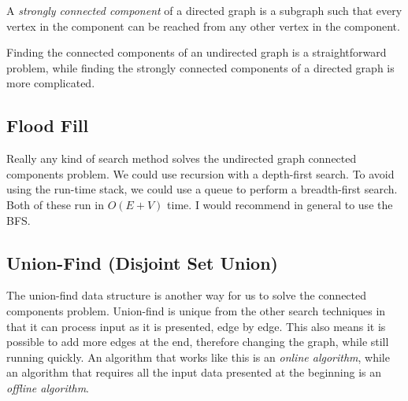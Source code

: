 \documentclass[11pt]{book}
\begin{document}
A \textit{strongly connected component} of a directed graph is a subgraph such that every vertex in the component can be reached from any other vertex in the component.

\begin{center}
\end{center}

Finding the connected components of an undirected graph is a straightforward problem, while finding the strongly connected components of a directed graph is more complicated.

\subsection{Flood Fill}

Really any kind of search method solves the undirected graph connected components problem. We could use recursion with a depth-first search. To avoid using the run-time stack, we could use a queue to perform a breadth-first search. Both of these run in $O(E+V)$ time. I would recommend in general to use the BFS.

\subsection{Union-Find (Disjoint Set Union)}

The union-find data structure is another way for us to solve the connected components problem. Union-find is unique from the other search techniques in that it can process input as it is presented, edge by edge. This also means it is possible to add more edges at the end, therefore changing the graph, while still running quickly. An algorithm that works like this is an \textit{online algorithm}, while an algorithm that requires all the input data presented at the beginning is an \textit{offline algorithm}.
\end{document}

